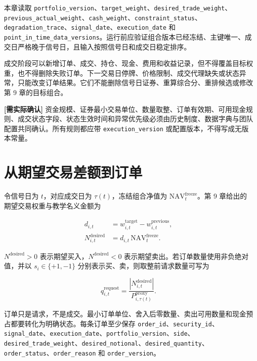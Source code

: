 本章读取 \texttt{portfolio\_version}、\texttt{target\_weight}、\texttt{desired\_trade\_weight}、\texttt{previous\_actual\_weight}、\texttt{cash\_weight}、\texttt{constraint\_status}、\texttt{degradation\_trace}、\texttt{signal\_date}、\texttt{execution\_date} 和 \texttt{point\_in\_time\_data\_versions}。运行前应验证组合版本已经冻结、主键唯一、成交日严格晚于信号日，且输入按照信号日和成交日稳定排序。

成交阶段可以新增订单、成交、持仓、现金、费用和收益记录，但不得覆盖目标权重，也不得删除失败订单。下一交易日停牌、价格限制、成交代理缺失或状态异常，只能改变订单结果。它们不能删除信号日证券、重算综合分、重排候选或修改第 9 章的目标组合。

\begin{confirmbox}
\textbf{[需实际确认]} 资金规模、证券最小交易单位、数量取整、订单有效期、可用现金规则、成交状态字段、状态生效时间和异常优先级必须由历史制度、数据字典与团队配置共同确认。所有规则都应带 \texttt{execution\_version} 或配置版本，不得写成无版本常量。
\end{confirmbox}

\section{从期望交易差额到订单}

令信号日为 \(t\)，对应成交日为 \(\tau(t)\)，冻结组合净值为 \(\mathrm{NAV}^{\mathrm{freeze}}_t\)。第 9 章给出的期望交易权重与教学名义金额为

\begin{align}
  d_{i,t}
  &= w^{\mathrm{target}}_{i,t}-w^{\mathrm{previous}}_{i,t},
  \label{eq:ch10-desired-weight}\\
  N^{\mathrm{desired}}_{i,t}
  &= d_{i,t}\,\mathrm{NAV}^{\mathrm{freeze}}_t.
  \label{eq:ch10-desired-notional}
\end{align}

\(N^{\mathrm{desired}}>0\) 表示期望买入，\(N^{\mathrm{desired}}<0\) 表示期望卖出。若订单数量使用非负绝对值，并以 \(s_i\in\{+1,-1\}\) 分别表示买、卖，则取整前请求数量可写为

\begin{equation}
  q^{\mathrm{request}}_{i,t}
  = \frac{\left|N^{\mathrm{desired}}_{i,t}\right|}
  {P^{\mathrm{proxy}}_{i,\tau(t)}}.
  \label{eq:ch10-requested-quantity}
\end{equation}

订单只是请求，不是成交。最小订单单位、舍入后零数量、卖出可用数量和现金预占都要转化为明确状态。每条订单至少保存 \texttt{order\_id}、\texttt{security\_id}、\texttt{signal\_date}、\texttt{execution\_date}、\texttt{portfolio\_version}、\texttt{side}、\texttt{desired\_trade\_weight}、\texttt{desired\_notional}、\texttt{desired\_quantity}、\texttt{order\_status}、\texttt{order\_reason} 和 \texttt{order\_version}。

